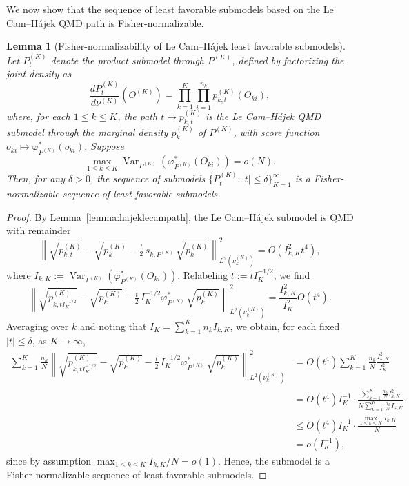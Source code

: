 \documentclass[11pt]{article}
\theoremstyle{plain}
\newtheorem{lemma}{Lemma}
\theoremstyle{definition}
\theoremstyle{remark}
\theoremstyle{definition}
\begin{document}
We now show that the sequence of least favorable submodels based on the Le Cam--Hájek QMD path is Fisher-normalizable.


\begin{lemma}[Fisher-normalizability of Le Cam--Hájek least favorable submodels]
Let \( P_t^{(K)} \) denote the product submodel through \( P^{(K)} \), defined by factorizing the joint density as
\[
\frac{dP_t^{(K)}}{d\nu^{(K)}}(O^{(K)}) = \prod_{k=1}^K \prod_{i=1}^{n_k} p_{k,t}^{(K)}(O_{ki}),
\]
where, for each \( 1 \leq k \leq K \), the path \( t \mapsto p_{k,t}^{(K)} \) is the Le Cam--Hájek QMD submodel through the marginal density \( p_k^{(K)} \) of \( P^{(K)} \), with score function \( o_{ki} \mapsto \varphi_{P^{(K)}}^*(o_{ki}) \). Suppose
\[
\max_{1 \leq k \leq K} \operatorname{Var}_{P^{(K)}}\left( \varphi_{P^{(K)}}^*(O_{ki}) \right) = o(N).
\]
Then, for any \( \delta > 0 \), the sequence of submodels \( \{P_t^{(K)} : |t| \leq \delta\}_{K=1}^\infty \) is a Fisher-normalizable sequence of least favorable submodels.
\end{lemma}
\begin{proof}
By Lemma~\ref{lemma:hajeklecampath}, the Le Cam--Hájek submodel is QMD with remainder
\[
\left\| \sqrt{p_{k,t}^{(K)}} - \sqrt{p_k^{(K)}} - \tfrac{t}{2}\,s_{k,P^{(K)}}\,\sqrt{p_k^{(K)}} \right\|_{L^2(\nu_k^{(K)})}^2
=  O(I_{k,K}^2 t^4),
\]
where \( I_{k,K} := \operatorname{Var}_{P^{(K)}}(\varphi_{P^{(K)}}^*(O_{ki})) \). Relabeling \( t := t I_K^{-1/2} \), we find
\[
\left\| \sqrt{p_{k,t I_K^{-1/2}}^{(K)}} - \sqrt{p_k^{(K)}} - \tfrac{t}{2}\, I_K^{-1/2} \varphi_{P^{(K)}}^*\,\sqrt{p_k^{(K)}} \right\|_{L^2(\nu_k^{(K)})}^2
= \frac{I_{k,K}^2}{I_K^2} O(t^4).
\]
Averaging over \( k \) and noting that \( I_K = \sum_{k=1}^K n_k I_{k,K} \), we obtain, for each fixed \( |t| \leq \delta \), as \( K \rightarrow \infty \),
\begin{align*}
   \sum_{k=1}^K \frac{n_k}{N} \left\| \sqrt{p_{k,t I_K^{-1/2}}^{(K)}} - \sqrt{p_k^{(K)}} - \tfrac{t}{2}\, I_K^{-1/2} \varphi_{P^{(K)}}^*\,\sqrt{p_k^{(K)}} \right\|_{L^2(\nu_k^{(K)})}^2
&=  O(t^4) \sum_{k=1}^K \frac{n_k}{N}  \frac{I_{k,K}^2}{I_K^2}  \\
&=  O(t^4)  I_K^{-1} \cdot \frac{\sum_{k=1}^K \frac{n_k}{N} I_{k,K}^2}{N \sum_{k=1}^K \frac{n_k}{N} I_{k,K}} \\
&\leq O(t^4) I_K^{-1} \cdot \frac{\max_{1 \leq k \leq K} I_{k,K}}{N} \\
&= o(I_K^{-1}),
\end{align*}
since by assumption \( \max_{1 \leq k \leq K} I_{k,K} / N = o(1) \). Hence, the submodel is a Fisher-normalizable sequence of least favorable submodels.
\end{proof}
\end{document}
